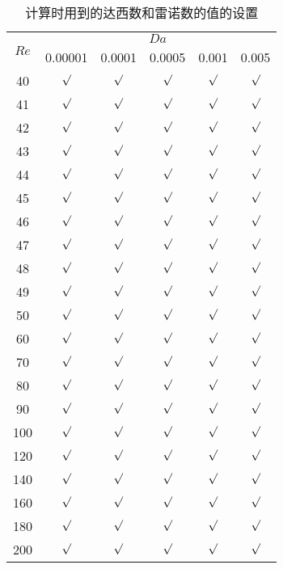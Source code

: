 \begin{table}
	\caption{计算时用到的达西数和雷诺数的值的设置}\label{tab: DaRe}
	\vspace{.5em}\centering\wuhao
	\begin{tabular}{*{6}{c}}
		\toprule[1.5pt]
		\multirow{2}[3]{*}{$Re$} & \multicolumn{5}{c}{$Da$} \\
		\cmidrule[.67pt](lr){2-6}
		& 0.00001 & 0.0001 & 0.0005 & 0.001 & 0.005 \\
		\midrule[1pt]
		40 & $\surd$ & $\surd$ & $\surd$ & $\surd$ & $\surd$ \\
		41 & $\surd$ & $\surd$ & $\surd$ & $\surd$ & $\surd$ \\
		42 & $\surd$ & $\surd$ & $\surd$ & $\surd$ & $\surd$ \\
		43 & $\surd$ & $\surd$ & $\surd$ & $\surd$ & $\surd$ \\
		44 & $\surd$ & $\surd$ & $\surd$ & $\surd$ & $\surd$ \\
		45 & $\surd$ & $\surd$ & $\surd$ & $\surd$ & $\surd$ \\
		46 & $\surd$ & $\surd$ & $\surd$ & $\surd$ & $\surd$ \\
		47 & $\surd$ & $\surd$ & $\surd$ & $\surd$ & $\surd$ \\
		48 & $\surd$ & $\surd$ & $\surd$ & $\surd$ & $\surd$ \\
		49 & $\surd$ & $\surd$ & $\surd$ & $\surd$ & $\surd$ \\
		50 & $\surd$ & $\surd$ & $\surd$ & $\surd$ & $\surd$ \\
		60 & $\surd$ & $\surd$ & $\surd$ & $\surd$ & $\surd$ \\
		70 & $\surd$ & $\surd$ & $\surd$ & $\surd$ & $\surd$ \\
		80 & $\surd$ & $\surd$ & $\surd$ & $\surd$ & $\surd$ \\
		90 & $\surd$ & $\surd$ & $\surd$ & $\surd$ & $\surd$ \\
		100 & $\surd$ & $\surd$ & $\surd$ & $\surd$ & $\surd$ \\
		120 & $\surd$ & $\surd$ & $\surd$ & $\surd$ & $\surd$ \\
		140 & $\surd$ & $\surd$ & $\surd$ & $\surd$ & $\surd$ \\
		160 & $\surd$ & $\surd$ & $\surd$ & $\surd$ & $\surd$ \\
		180 & $\surd$ & $\surd$ & $\surd$ & $\surd$ & $\surd$ \\
		200 & $\surd$ & $\surd$ & $\surd$ & $\surd$ & $\surd$ \\
		\bottomrule[1.5pt]
	\end{tabular}
\end{table}

